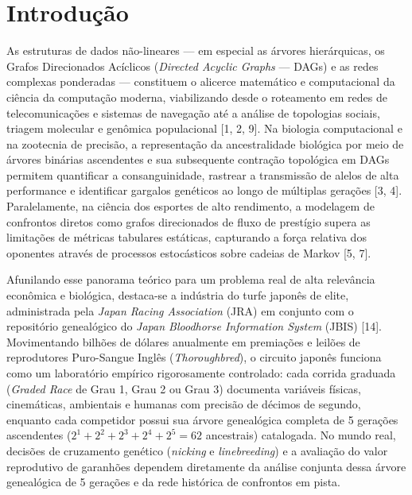 \documentclass[conference]{IEEEtran}
\begin{document}
\section{Introdução}
As estruturas de dados não-lineares --- em especial as árvores hierárquicas, os Grafos Direcionados Acíclicos (\textit{Directed Acyclic Graphs} --- DAGs) e as redes complexas ponderadas --- constituem o alicerce matemático e computacional da ciência da computação moderna, viabilizando desde o roteamento em redes de telecomunicações e sistemas de navegação até a análise de topologias sociais, triagem molecular e genômica populacional [1, 2, 9]. Na biologia computacional e na zootecnia de precisão, a representação da ancestralidade biológica por meio de árvores binárias ascendentes e sua subsequente contração topológica em DAGs permitem quantificar a consanguinidade, rastrear a transmissão de alelos de alta performance e identificar gargalos genéticos ao longo de múltiplas gerações [3, 4]. Paralelamente, na ciência dos esportes de alto rendimento, a modelagem de confrontos diretos como grafos direcionados de fluxo de prestígio supera as limitações de métricas tabulares estáticas, capturando a força relativa dos oponentes através de processos estocásticos sobre cadeias de Markov [5, 7].

Afunilando esse panorama teórico para um problema real de alta relevância econômica e biológica, destaca-se a indústria do turfe japonês de elite, administrada pela \textit{Japan Racing Association} (JRA) em conjunto com o repositório genealógico do \textit{Japan Bloodhorse Information System} (JBIS) [14]. Movimentando bilhões de dólares anualmente em premiações e leilões de reprodutores Puro-Sangue Inglês (\textit{Thoroughbred}), o circuito japonês funciona como um laboratório empírico rigorosamente controlado: cada corrida graduada (\textit{Graded Race} de Grau 1, Grau 2 ou Grau 3) documenta variáveis físicas, cinemáticas, ambientais e humanas com precisão de décimos de segundo, enquanto cada competidor possui sua árvore genealógica completa de 5 gerações ascendentes ($2^1 + 2^2 + 2^3 + 2^4 + 2^5 = 62$ ancestrais) catalogada. No mundo real, decisões de cruzamento genético (\textit{nicking} e \textit{linebreeding}) e a avaliação do valor reprodutivo de garanhões dependem diretamente da análise conjunta dessa árvore genealógica de 5 gerações e da rede histórica de confrontos em pista.
\end{document}
